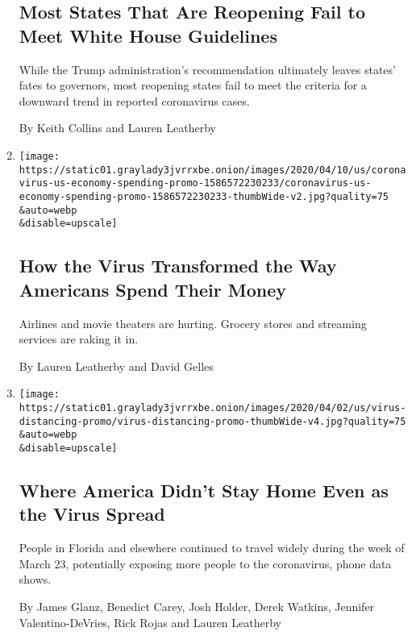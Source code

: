 \begin{enumerate}
  \hypertarget{most-states-that-are-reopening-fail-to-meet-white-house-guidelines}{%
  \subsection{Most States That Are Reopening Fail to Meet White House
  Guidelines}\label{most-states-that-are-reopening-fail-to-meet-white-house-guidelines}}

  While the Trump administration's recommendation ultimately leaves
  states' fates to governors, most reopening states fail to meet the
  criteria for a downward trend in reported coronavirus cases.

  By Keith Collins and Lauren Leatherby
\item
  \href{/interactive/2020/04/11/business/economy/coronavirus-us-economy-spending.html}{}

  \texttt{[image: https://static01.graylady3jvrrxbe.onion/images/2020/04/10/us/coronavirus-us-economy-spending-promo-1586572230233/coronavirus-us-economy-spending-promo-1586572230233-thumbWide-v2.jpg?quality=75\\\&auto=webp\\\&disable=upscale]}

  \hypertarget{how-the-virus-transformed-the-way-americans-spend-their-money}{%
  \subsection{How the Virus Transformed the Way Americans Spend Their
  Money}\label{how-the-virus-transformed-the-way-americans-spend-their-money}}

  Airlines and movie theaters are hurting. Grocery stores and streaming
  services are raking it in.

  By Lauren Leatherby and David Gelles
\item
  \href{/interactive/2020/04/02/us/coronavirus-social-distancing.html}{}

  \texttt{[image: https://static01.graylady3jvrrxbe.onion/images/2020/04/02/us/virus-distancing-promo/virus-distancing-promo-thumbWide-v4.jpg?quality=75\\\&auto=webp\\\&disable=upscale]}

  \hypertarget{where-america-didnt-stay-home-even-as-the-virus-spread}{%
  \subsection{Where America Didn't Stay Home Even as the Virus
  Spread}\label{where-america-didnt-stay-home-even-as-the-virus-spread}}

  People in Florida and elsewhere continued to travel widely during the
  week of March 23, potentially exposing more people to the coronavirus,
  phone data shows.

  By James Glanz, Benedict Carey, Josh Holder, Derek Watkins, Jennifer
  Valentino-DeVries, Rick Rojas and Lauren Leatherby
\end{enumerate}

